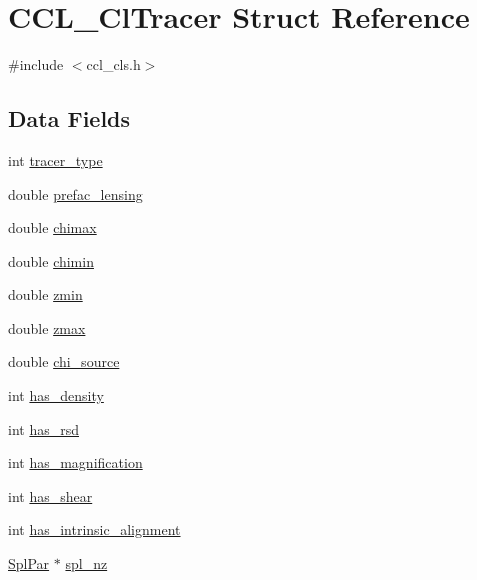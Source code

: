 \hypertarget{struct_c_c_l___cl_tracer}{}\section{C\+C\+L\+\_\+\+Cl\+Tracer Struct Reference}
\label{struct_c_c_l___cl_tracer}


{\ttfamily \#include $<$ccl\+\_\+cls.\+h$>$}

\subsection*{Data Fields}
\begin{DoxyCompactItemize}
\item 
int \mbox{\hyperlink{struct_c_c_l___cl_tracer_a782f0812a2c0ebf86f9dda4d2d893507}{tracer\+\_\+type}}
\item 
double \mbox{\hyperlink{struct_c_c_l___cl_tracer_ae8f4fab867f33693c511b4faa5040844}{prefac\+\_\+lensing}}
\item 
double \mbox{\hyperlink{struct_c_c_l___cl_tracer_abecca79aa244fbc52bb07faece651988}{chimax}}
\item 
double \mbox{\hyperlink{struct_c_c_l___cl_tracer_ad7be7e9b48dfc1259f5a021d51f97eaa}{chimin}}
\item 
double \mbox{\hyperlink{struct_c_c_l___cl_tracer_ae44938293ee360a536f3bfd2bb9570c4}{zmin}}
\item 
double \mbox{\hyperlink{struct_c_c_l___cl_tracer_ad7a6c9c9f67c153a04a047fcc65a7512}{zmax}}
\item 
double \mbox{\hyperlink{struct_c_c_l___cl_tracer_a30b515b52f45e8281846749af76756ad}{chi\+\_\+source}}
\item 
int \mbox{\hyperlink{struct_c_c_l___cl_tracer_a8253032d6f5d9aedfbde9e376eafdc47}{has\+\_\+density}}
\item 
int \mbox{\hyperlink{struct_c_c_l___cl_tracer_a2fd0fa101614e87cc8b78fa6fff78b8e}{has\+\_\+rsd}}
\item 
int \mbox{\hyperlink{struct_c_c_l___cl_tracer_a2144bb85ca1a13bf4d3bfa50c81b76aa}{has\+\_\+magnification}}
\item 
int \mbox{\hyperlink{struct_c_c_l___cl_tracer_afea83a28e45e0ca07bcf42d2715ce8d5}{has\+\_\+shear}}
\item 
int \mbox{\hyperlink{struct_c_c_l___cl_tracer_a7f46320f8de31772bc705f73f1dee4cb}{has\+\_\+intrinsic\+\_\+alignment}}
\item 
\mbox{\hyperlink{struct_spl_par}{Spl\+Par}} $\ast$ \mbox{\hyperlink{struct_c_c_l___cl_tracer_aac45004e79118de3066f7cb36ba5c816}{spl\+\_\+nz}}

\end{DoxyCompactItemize}
